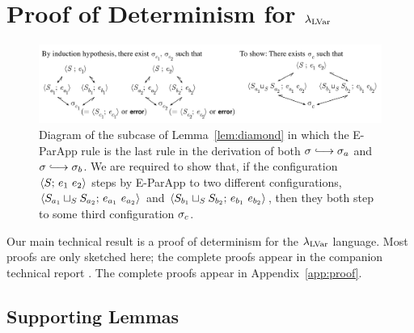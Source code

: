 \section{Proof of Determinism for $\textup{\ensuremath{\lambda_{\textrm{LVar}}}}$}\label{section:proof}

\begin{figure}
\centering
  \includegraphics[width=6in,natwidth=1747px,natheight=402px]{chapter2/figures/ParAppParApp.pdf} 
  \caption{\footnotesize Diagram of the subcase of
    Lemma~\ref{lem:diamond}
    in which the {\sc E-ParApp} rule is the last rule in the
    derivation of both $\conf \parstepsto \conf_a$ and $\conf
    \parstepsto \conf_b$.
    We are required to show that, if the
    configuration $\langle S;\, e_1~e_2 \rangle$ steps by {\sc
      E-ParApp} to two different configurations,
    $\langle S_{a_1} \sqcup_{S} S_{a_2};\, e_{a_1}~e_{a_2} \rangle$ and
    $\langle S_{b_1} \sqcup_{S} S_{b_2};\, e_{b_1}~e_{b_2} \rangle$,
    then they both step to some third configuration $\sigma_c$.
  }
  \label{f:diamond-parapp-parapp}
\end{figure}

Our main technical result is a proof of determinism for the
$\textup{\ensuremath{\lambda_{\textrm{LVar}}}}$ language.
\ifx\fulltr\undefined
Most proofs are only sketched here; the complete
proofs appear in the companion technical
report \cite{lampar-TR}.
\else
The complete proofs appear in Appendix~\ref{app:proof}.
\fi

\subsection{Supporting Lemmas}\label{subsection:independence}

